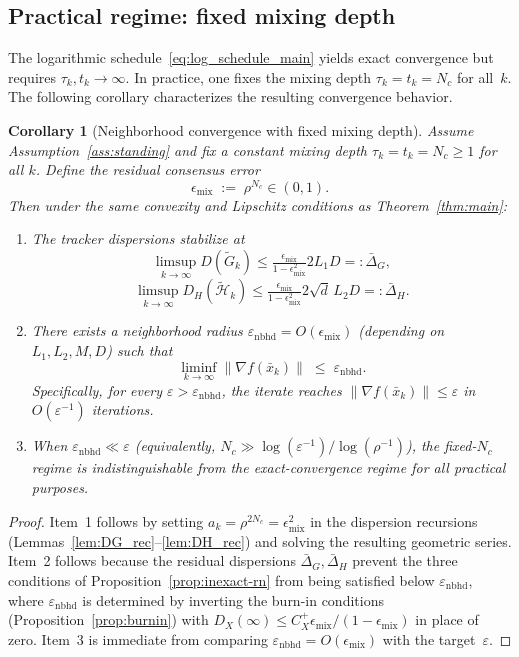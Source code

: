 \documentclass[10pt,twocolumn,letterpaper]{article}
\def\cO{O}%
\theoremstyle{compact}
\newtheorem{corollary}[theorem]{Corollary}
\theoremstyle{compactremark}
\newcommand{\cO}{\mathcal{O}}
\begin{document}
\subsection{Practical regime: fixed mixing depth}\label{ssec:fixed_nc}

The logarithmic schedule~\eqref{eq:log_schedule_main} yields exact convergence but requires
$\tau_k,t_k\to\infty$.
In practice, one fixes the mixing depth $\tau_k=t_k=N_c$ for all~$k$.
The following corollary characterizes the resulting convergence behavior.

\begin{corollary}[Neighborhood convergence with fixed mixing depth]\label{cor:fixed_nc}
Assume Assumption~\ref{ass:standing} and fix a constant mixing depth $\tau_k=t_k=N_c\ge 1$ for all $k$.
Define the residual consensus error
\[
\epsilon_{\mathrm{mix}} \;:=\; \rho^{N_c}\in(0,1).
\]
Then under the same convexity and Lipschitz conditions as Theorem~\ref{thm:main}:
\begin{enumerate}[leftmargin=1.2em,itemsep=2pt]
\item The tracker dispersions stabilize at
\[
\limsup_{k\to\infty} D(\tilde G_k)
\le \tfrac{\epsilon_{\mathrm{mix}}}{1-\epsilon_{\mathrm{mix}}^2}2L_1D
=: \bar\Delta_G,
\]
\[
\limsup_{k\to\infty} D_H(\tilde{\mathcal H}_k)
\le \tfrac{\epsilon_{\mathrm{mix}}}{1-\epsilon_{\mathrm{mix}}^2}2\sqrt{d}\,L_2D
=: \bar\Delta_H.
\]
\item There exists a neighborhood radius $\varepsilon_{\mathrm{nbhd}}=\cO(\epsilon_{\mathrm{mix}})$
(depending on $L_1,L_2,M,D$) such that
\[
\liminf_{k\to\infty}\|\nabla f(\bar x_k)\|\;\le\; \varepsilon_{\mathrm{nbhd}}.
\]
Specifically, for every $\varepsilon>\varepsilon_{\mathrm{nbhd}}$, the iterate reaches
$\|\nabla f(\bar x_k)\|\le \varepsilon$ in $\cO(\varepsilon^{-1})$ iterations.
\item When $\varepsilon_{\mathrm{nbhd}}\ll\varepsilon$
(equivalently, $N_c\gg \log(\varepsilon^{-1})/\log(\rho^{-1})$),
the fixed-$N_c$ regime is indistinguishable from the exact-convergence regime
for all practical purposes.
\end{enumerate}
\end{corollary}

\begin{proof}
Item~1 follows by setting $a_k=\rho^{2N_c}=\epsilon_{\mathrm{mix}}^2$ in the
dispersion recursions (Lemmas~\ref{lem:DG_rec}--\ref{lem:DH_rec}) and solving the
resulting geometric series.
Item~2 follows because the residual dispersions $\bar\Delta_G, \bar\Delta_H$
prevent the three conditions of Proposition~\ref{prop:inexact-rn} from being
satisfied below $\varepsilon_{\mathrm{nbhd}}$,
where $\varepsilon_{\mathrm{nbhd}}$ is determined by inverting the burn-in
conditions (Proposition~\ref{prop:burnin}) with
$D_X(\infty)\le C_X^{+}\epsilon_{\mathrm{mix}}/(1-\epsilon_{\mathrm{mix}})$
in place of zero.
Item~3 is immediate from comparing $\varepsilon_{\mathrm{nbhd}}=\cO(\epsilon_{\mathrm{mix}})$
with the target~$\varepsilon$.
\end{proof}
\end{document}
